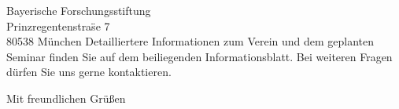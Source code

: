 \documentclass[../style/orpheus,fontsize=11pt]{scrlttr2}
\begin{document}
\begin{letter}{
\noindent Bayerische Forschungsstiftung \\
Prinzregentenstra\"se 7\\
80538 M\"unchen
}
Detailliertere Informationen zum Verein und dem geplanten Seminar finden Sie auf dem beiliegenden Informationsblatt.  Bei weiteren Fragen  d\"urfen Sie uns gerne kontaktieren.





\closing{Mit freundlichen Gr\"u\ss en}


\end{letter}
\end{document}
